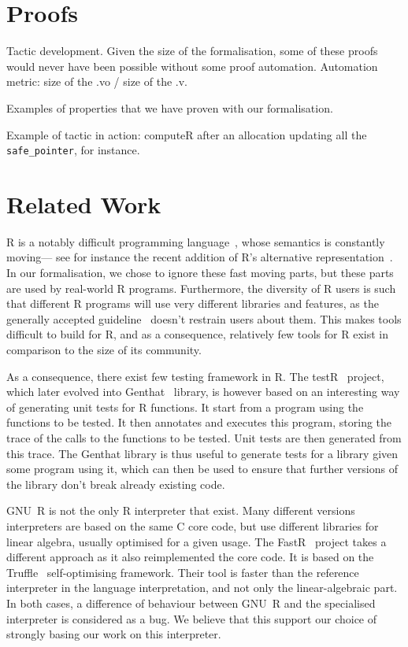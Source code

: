 \documentclass[
    sigplan,
    10pt,
    review, %
    natbib=false %
 ]{acmart}
\begin{document}
\section{Proofs}
\label{sec:proofs}

Tactic development.
Given the size of the formalisation, some of these proofs would never have been possible
without some proof automation.
Automation metric: size of the .vo / size of the .v.

Examples of properties that we have proven with our formalisation.

Example of tactic in action:
computeR after an allocation updating all the \texttt{safe_pointer}, for instance.

\section{Related Work}
\label{sec:related:work}

R is a notably difficult programming language~\parencite{RInferno},
whose semantics is constantly moving—%
see for instance the recent addition
of R’s alternative representation~\parencite{altrepR}.
In our formalisation, we chose to ignore these fast moving parts,
but these parts are used by real-world R programs.
Furthermore, the diversity of R users is such that different R programs
will use very different libraries and features,
as the generally accepted guideline~\parencite{RGuidelines}
doesn’t restrain users about them.
This makes tools difficult to build for R,
and as a consequence, relatively few tools for R exist
in comparison to the size of its community.

As a consequence,
there exist few testing framework in R.
The testR~\parencite{maj2013testr, 2014testr} project,
which later evolved into Genthat~\parencite{genthat} library,
is however based on an interesting way of generating unit tests for R functions.
It start from a program using the functions to be tested.
It then annotates and executes this program,
storing the trace of the calls to the functions to be tested.
Unit tests are then generated from this trace.
The Genthat library is thus useful to generate tests for a library
given some program using it,
which can then be used to ensure that further versions of the library
don’t break already existing code.

GNU~R is not the only R interpreter that exist.
Many different versions interpreters are based on the same C core code,
but use different libraries for linear algebra,
usually optimised for a given usage.
%
The FastR~\parencite{kalibera2014fast} project takes a different approach
as it also reimplemented the core code.
It is based on the Truffle~\parencite{wuerthingertruffle}
self-optimising framework.
Their tool is faster than the reference interpreter
in the language interpretation, and not only the linear-algebraic part.
%
In both cases, a difference of behaviour between GNU~R
and the specialised interpreter is considered as a bug.
We believe that this support our choice of strongly basing
our work on this interpreter.
\end{document}
